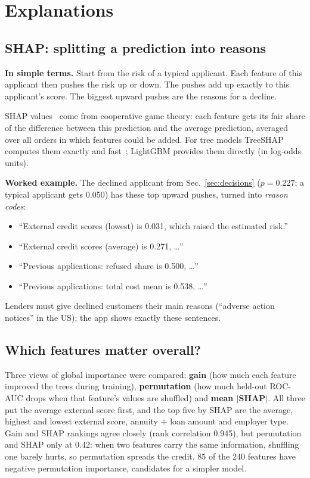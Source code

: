 \documentclass[conference,10pt]{IEEEtran}
\newcommand{\simple}[1]{\par\smallskip\noindent\colorbox{gray!13}{\parbox{\dimexpr\columnwidth-2\fboxsep\relax}{\small\textbf{In simple terms.} #1}}\par\smallskip}
\begin{document}
\section{Explanations}
\label{sec:xai}

\subsection{SHAP: splitting a prediction into reasons}
\simple{Start from the risk of a typical applicant. Each feature of this applicant then pushes
the risk up or down. The pushes add up exactly to this applicant's score. The biggest upward
pushes are the reasons for a decline.}

SHAP values~\cite{lundberg2017} come from cooperative game theory: each feature gets its fair
share of the difference between this prediction and the average prediction, averaged over all
orders in which features could be added. For tree models TreeSHAP computes them exactly and
fast~\cite{lundberg2020}; LightGBM provides them directly (in log-odds units).

\textbf{Worked example.} The declined applicant from Sec.~\ref{sec:decisions} ($p = 0.227$; a
typical applicant gets 0.050) has these top upward pushes, turned into \emph{reason codes}:
\begin{itemize}
\item ``External credit scores (lowest) is 0.031, which raised the estimated risk.''
\item ``External credit scores (average) is 0.271, \ldots''
\item ``Previous applications: refused share is 0.500, \ldots''
\item ``Previous applications: total cost mean is 0.538, \ldots''
\end{itemize}
Lenders must give declined customers their main reasons (``adverse action notices'' in the
US); the app shows exactly these sentences.

\subsection{Which features matter overall?}
Three views of global importance were compared:
\textbf{gain} (how much each feature improved the trees during training),
\textbf{permutation} (how much held-out ROC-AUC drops when that feature's values are shuffled)
and \textbf{mean $|$SHAP$|$}. All three put the average external score first, and the top five
by SHAP are the average, highest and lowest external score, annuity $\div$ loan amount and
employer type. Gain and SHAP rankings agree closely (rank correlation 0.945), but permutation
and SHAP only at 0.42: when two features carry the same information, shuffling one barely hurts,
so permutation spreads the credit. 85 of the 240 features have negative permutation importance,
candidates for a simpler model.
\end{document}
